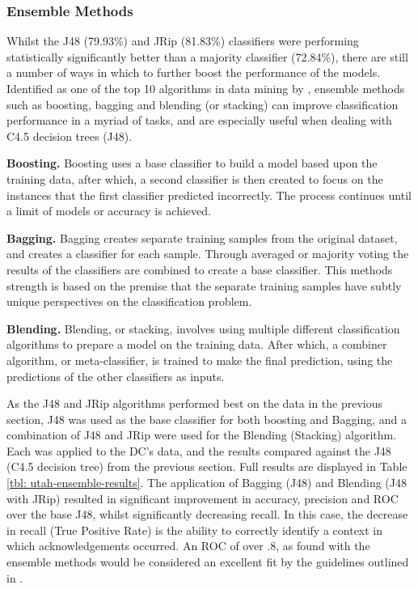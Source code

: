 \subsubsection{Ensemble Methods}
Whilst the J48 (79.93\%) and JRip (81.83\%) classifiers were performing statistically significantly better than a majority classifier (72.84\%), there are still a number of ways in which to further boost the performance of the models. Identified as one of the top 10 algorithms in data mining by \citeauthor{Wu2007} \cite{Wu2007}, ensemble methods such as boosting, bagging and blending (or stacking) can improve classification performance in a myriad of tasks, and are especially useful when dealing with C4.5 decision trees (J48).

\textbf{Boosting.}
Boosting uses a base classifier to build a model based upon the training data, after which, a second classifier is then created to focus on the instances that the first classifier predicted incorrectly. The process continues until a limit of models or accuracy is achieved.

\textbf{Bagging.}
Bagging creates separate training samples from the original dataset, and creates a classifier for each sample. Through averaged or majority voting the results of the classifiers are combined to create a base classifier. This methods strength is based on the premise that the separate training samples have subtly unique perspectives on the classification problem. 

\textbf{Blending.}
Blending, or stacking, involves using multiple different classification algorithms to prepare a model on the training data. After which, a combiner algorithm, or meta-classifier, is trained to make the final prediction, using the predictions of the other classifiers as inputs.

As the J48 and JRip algorithms performed best on the data in the previous section, J48 was used as the base classifier for both boosting and Bagging, and a combination of J48 and JRip were used for the Blending (Stacking) algorithm. Each was applied to the DC's data, and the results compared against the J48 (C4.5 decision tree) from the previous section. Full results are displayed in Table \ref{tbl: utah-ensemble-results}. The application of Bagging (J48) and Blending (J48 with JRip) resulted in significant improvement in accuracy, precision and ROC over the base J48, whilst significantly decreasing recall. In this case, the decrease in recall (True Positive Rate) is the ability to correctly identify a context in which acknowledgements occurred. An ROC of over .8, as found with the ensemble methods would be considered an excellent fit by the guidelines outlined in \cite{Tape}.

